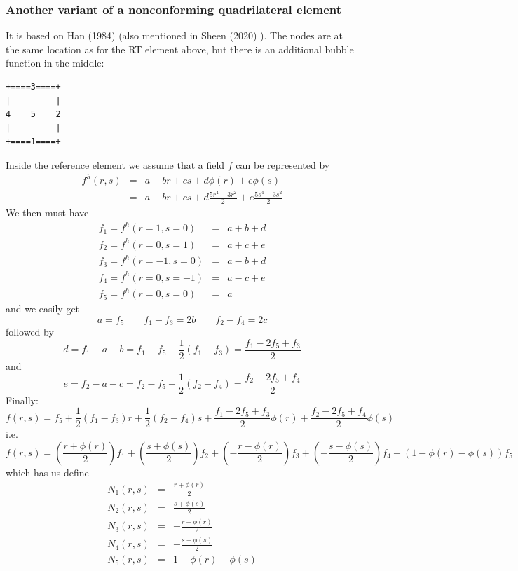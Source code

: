 \subsubsection*{Another variant of a nonconforming quadrilateral element}

It is based on Han (1984) \cite{han84} (also mentioned in Sheen (2020) \cite{shee20}).
The nodes are at the same location as for the RT element above, but 
there is an additional bubble function in the middle:
\begin{verbatim}
+====3====+
|         |
4    5    2
|         |
+====1====+
\end{verbatim}
Inside the reference element we assume that a field $f$
can be represented by 
\begin{eqnarray}
f^h(r,s) 
&=& a+ br +cs +d \phi(r) +e \phi(s) \\
&=& a+ br +cs +d \frac{5r^4-3r^2}{2}+e \frac{5s^4-3s^2}{2}
\end{eqnarray}
We then must have 
\begin{eqnarray}
f_1 = f^h(r=1,s=0) &=& a+ b +d \\
f_2 = f^h(r=0,s=1) &=& a+ c +e \\
f_3 = f^h(r=-1,s=0) &=& a- b +d \\
f_4 = f^h(r=0,s=-1) &=& a -c +e\\
f_5 = f^h(r=0,s=0) &=& a 
\end{eqnarray}
and we easily get 
\[
a = f_5 
\qquad
f_1-f_3 = 2b
\qquad 
f_2-f_4 = 2c
\]
followed by
\[
d=f_1-a-b = f_1 - f_5 - \frac{1}{2}(f_1-f_3) = \frac{f_1-2f_5+f_3}{2}
\]
and 
\[
e = f_2-a-c = f_2 - f_5 -  \frac{1}{2}(f_2-f_4) = \frac{f_2 -2f_5+f_4 }{2}
\]
Finally:
\[
f(r,s) = 
f_5 +
\frac{1}{2}(f_1-f_3) r+
\frac{1}{2}(f_2-f_4) s+
\frac{f_1-2f_5+f_3}{2} \phi(r)+
\frac{f_2 -2f_5+f_4 }{2} \phi(s)
\]
i.e.
\[
f(r,s) = 
\left(\frac{r + \phi(r)}{2} \right)f_1 +
\left(\frac{s+\phi(s)}{2} \right)f_2 +
\left(-\frac{r-\phi(r)}{2} \right)f_3 +
\left(-\frac{s - \phi(s)}{2} \right)f_4 +
\left(1-\phi(r)-\phi(s) \right)f_5 
\]
which has us define 
\begin{eqnarray}
N_1(r,s) &=& \frac{r + \phi(r)}{2} \\
N_2(r,s) &=& \frac{s+\phi(s)}{2}\\
N_3(r,s) &=& -\frac{r-\phi(r)}{2} \\
N_4(r,s) &=& -\frac{s - \phi(s)}{2}\\
N_5(r,s) &=& 1-\phi(r)-\phi(s)
\end{eqnarray}
